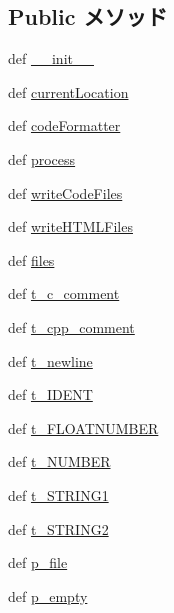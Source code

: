 \subsection*{Public メソッド}
\begin{DoxyCompactItemize}
\item 
def \hyperlink{classslicc_1_1parser_1_1SLICC_ac775ee34451fdfa742b318538164070e}{\_\-\_\-init\_\-\_\-}
\item 
def \hyperlink{classslicc_1_1parser_1_1SLICC_a9edcf93d83265ddad0112028dc4feded}{currentLocation}
\item 
def \hyperlink{classslicc_1_1parser_1_1SLICC_a68362f78121a5495eaa849608e1bed7a}{codeFormatter}
\item 
def \hyperlink{classslicc_1_1parser_1_1SLICC_a7f3389f4759618032e662129016fc269}{process}
\item 
def \hyperlink{classslicc_1_1parser_1_1SLICC_a69d0582bde832d4ff45237ab5ff116bb}{writeCodeFiles}
\item 
def \hyperlink{classslicc_1_1parser_1_1SLICC_abc09a7197df5d7ef04e5cdfaa1139ead}{writeHTMLFiles}
\item 
def \hyperlink{classslicc_1_1parser_1_1SLICC_a35b1a87f6fcbddeb5b793b0e415765f8}{files}
\item 
def \hyperlink{classslicc_1_1parser_1_1SLICC_a945f66f71618f4c9d3f34f07e5ec379a}{t\_\-c\_\-comment}
\item 
def \hyperlink{classslicc_1_1parser_1_1SLICC_a30488dc841b93edf47146e784f2d61c7}{t\_\-cpp\_\-comment}
\item 
def \hyperlink{classslicc_1_1parser_1_1SLICC_a1b02371c148efc8eb5d363c18ce1a66e}{t\_\-newline}
\item 
def \hyperlink{classslicc_1_1parser_1_1SLICC_abe14fa96d0f17314cdd2d8d948dbdb0f}{t\_\-IDENT}
\item 
def \hyperlink{classslicc_1_1parser_1_1SLICC_aadb1a19aa82b065b5d230a3ad3932c5c}{t\_\-FLOATNUMBER}
\item 
def \hyperlink{classslicc_1_1parser_1_1SLICC_a167586bbddfb15c45d1d17013c9c3e6b}{t\_\-NUMBER}
\item 
def \hyperlink{classslicc_1_1parser_1_1SLICC_abd4e61ce3cb555f0255dac82265869e2}{t\_\-STRING1}
\item 
def \hyperlink{classslicc_1_1parser_1_1SLICC_a94aee35d70b10376860b1df963c6408f}{t\_\-STRING2}
\item 
def \hyperlink{classslicc_1_1parser_1_1SLICC_ab7ba17cc0149c473abd251c9b96ceaf9}{p\_\-file}
\item 
def \hyperlink{classslicc_1_1parser_1_1SLICC_a7838c6749e452fa55c474e8b3f995a6c}{p\_\-empty}

\end{DoxyCompactItemize}
